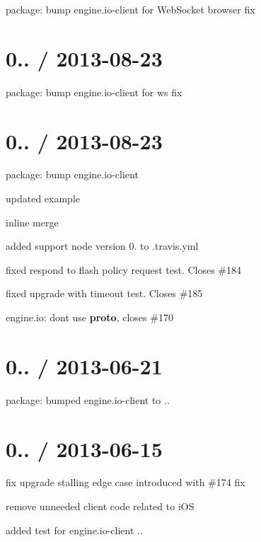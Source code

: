 \begin{DoxyItemize}
\item package\+: bump {\ttfamily engine.\+io-\/client} for {\ttfamily Web\+Socket} browser fix
\end{DoxyItemize}

\section*{0.. / 2013-\/08-\/23 }


\begin{DoxyItemize}
\item package\+: bump engine.\+io-\/client for ws fix
\end{DoxyItemize}

\section*{0.. / 2013-\/08-\/23 }


\begin{DoxyItemize}
\item package\+: bump engine.\+io-\/client
\item updated example
\item inline merge
\item added support node version 0. to .travis.\+yml
\item fixed respond to flash policy request test. Closes \#184
\item fixed upgrade with timeout test. Closes \#185
\item engine.\+io\+: don\textquotesingle{}t use {\bfseries proto}, closes \#170
\end{DoxyItemize}

\section*{0.. / 2013-\/06-\/21 }


\begin{DoxyItemize}
\item package\+: bumped {\ttfamily engine.\+io-\/client} to {..}
\end{DoxyItemize}

\section*{0.. / 2013-\/06-\/15 }


\begin{DoxyItemize}
\item fix upgrade stalling edge case introduced with \#174 fix
\item remove unneeded client code related to i\+OS
\item added test for {\ttfamily engine.\+io-\/client} {..}
\end{DoxyItemize}

